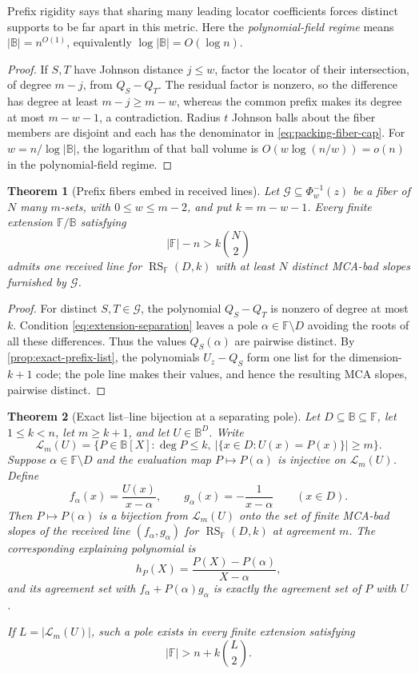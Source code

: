 \documentclass[12pt,a4paper]{amsart}
\numberwithin{equation}{section}
\newtheorem{theorem}{Theorem}[section]
\theoremstyle{remark}
\DeclareMathOperator{\RS}{RS}
\newcommand{\F}{\mathbb F}
\newcommand{\B}{\mathbb B}
\newcommand{\Lcal}{\mathcal L}
\newcommand{\abs}[1]{\lvert #1\rvert}
\begin{document}
Prefix rigidity says that sharing many leading locator coefficients forces
distinct supports to be far apart in this metric.  Here the
\emph{polynomial-field regime} means \(\abs\B=n^{O(1)}\), equivalently
\(\log\abs\B=O(\log n)\).

\begin{proof}
If \(S,T\) have Johnson distance \(j\le w\), factor the locator of their
intersection, of degree \(m-j\), from \(Q_S-Q_T\).  The residual factor is
nonzero, so the difference has degree at least \(m-j\ge m-w\), whereas the
common prefix makes its degree at most \(m-w-1\), a contradiction.  Radius
\(t\) Johnson balls about the fiber members are disjoint and each has the
denominator in \eqref{eq:packing-fiber-cap}.  For
\(w=n/\log\abs\B\), the logarithm of that ball volume is
\(O(w\log(n/w))=o(n)\) in the polynomial-field regime.
\end{proof}

\begin{theorem}[Prefix fibers embed in received lines]
\label{thm:prefix-to-line-hardness}
Let \(\mathcal G\subseteq\Phi_w^{-1}(z)\) be a fiber of \(N\) many
\(m\)-sets, with \(0\le w\le m-2\), and put \(k=m-w-1\).  Every finite
extension \(\F/\B\) satisfying
\[
        \abs\F-n>k\binom N2
        \tag{4.5}\label{eq:extension-separation}
\]
admits one received line for \(\RS_\F(D,k)\) with at least \(N\) distinct
MCA-bad slopes furnished by \(\mathcal G\).
\end{theorem}

\begin{proof}
For distinct \(S,T\in\mathcal G\), the polynomial \(Q_S-Q_T\) is nonzero
of degree at most \(k\).  Condition \eqref{eq:extension-separation} leaves a
pole \(\alpha\in\F\setminus D\) avoiding the roots of all these
differences.  Thus the values \(Q_S(\alpha)\) are pairwise distinct.  By
\cref{prop:exact-prefix-list}, the polynomials \(U_z-Q_S\) form one list for
the dimension-\(k+1\) code; the pole line makes their values, and hence the
resulting MCA slopes, pairwise distinct.
\end{proof}

\begin{theorem}[Exact list--line bijection at a separating pole]
\label{thm:exact-list-line-bijection}
Let \(D\subseteq\B\subseteq\F\), let \(1\le k<n\), let \(m\ge k+1\),
and let \(U\in\B^D\).  Write
\[
 \Lcal_m(U)=\{P\in\B[X]:\deg P\le k,
       \ \abs{\{x\in D:U(x)=P(x)\}}\ge m\}.
\]
Suppose \(\alpha\in\F\setminus D\) and the evaluation map
\(P\mapsto P(\alpha)\) is injective on \(\Lcal_m(U)\).  Define
\[
 f_\alpha(x)=\frac{U(x)}{x-\alpha},\qquad
 g_\alpha(x)=-\frac1{x-\alpha}\qquad(x\in D).
\]
Then \(P\mapsto P(\alpha)\) is a bijection from \(\Lcal_m(U)\) onto
the set of finite MCA-bad slopes of the received line
\((f_\alpha,g_\alpha)\) for \(\RS_\F(D,k)\) at agreement \(m\).  The
corresponding explaining polynomial is
\[
       h_P(X)=\frac{P(X)-P(\alpha)}{X-\alpha},
\]
and its agreement set with
\(f_\alpha+P(\alpha)g_\alpha\) is exactly the agreement set of \(P\)
with \(U\).

If \(L=\abs{\Lcal_m(U)}\), such a pole exists in every finite extension
satisfying
\[
       \abs\F>n+k\binom L2.                         \tag{4.6}
\]
\end{theorem}
\end{document}
